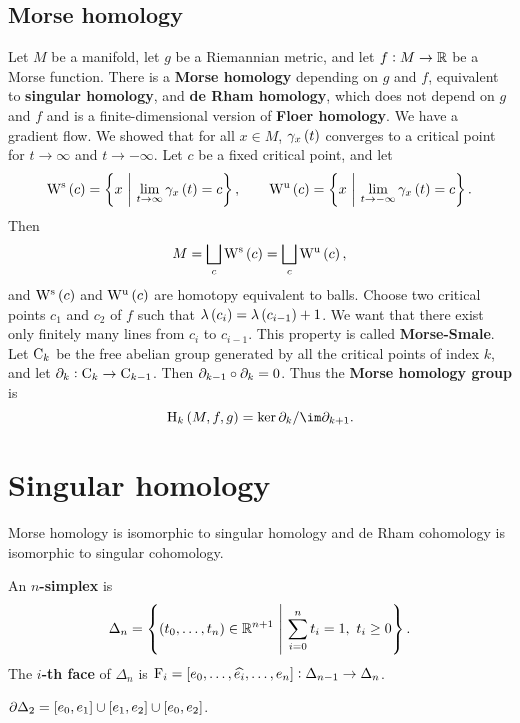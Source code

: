 \subsection{Morse homology}

Let $ M $ be a manifold, let $ g $ be a Riemannian metric, and let $ f : M \to \mathbb{R} $ be a Morse function. There is a \textbf{Morse homology} depending on $ g $ and $ f $, equivalent to \textbf{singular homology}, and \textbf{de Rham homology}, which does not depend on $ g $ and $ f $ and is a finite-dimensional version of \textbf{Floer homology}. We have a gradient flow. We showed that for all $ x \in M $, $ \gamma_x\br{t} $ converges to a critical point for $ t \to \infty $ and $ t \to -\infty $. Let $ c $ be a fixed critical point, and let
$$ \W^\s\br{c} = \cbr{x \st \lim_{t \to \infty} \gamma_x\br{t} = c}, \qquad \W^\u\br{c} = \cbr{x \st \lim_{t \to -\infty} \gamma_x\br{t} = c}. $$
Then
$$ M = \bigsqcup_c \W^\s\br{c} = \bigsqcup_c \W^\u\br{c}, $$
and $ \W^\s\br{c} $ and $ \W^\u\br{c} $ are homotopy equivalent to balls. Choose two critical points $ c_1 $ and $ c_2 $ of $ f $ such that $ \lambda\br{c_i} = \lambda\br{c_{i - 1}} + 1 $. We want that there exist only finitely many lines from $ c_i $ to $ c_{i - 1} $. This property is called \textbf{Morse-Smale}. Let $ \mathrm{C}_k $ be the free abelian group generated by all the critical points of index $ k $, and let $ \partial_k : \mathrm{C}_k \to \mathrm{C}_{k - 1} $. Then $ \partial_{k - 1} \circ \partial_k = 0 $. Thus the \textbf{Morse homology group} is
$$ \H_k\br{M, f, g} = \ker \da_k / \im \da_{k + 1}. $$

\pagebreak

\section{Singular homology}


Morse homology is isomorphic to singular homology and de Rham cohomology is isomorphic to singular cohomology.

\begin{definition}
An \textbf{$ n $-simplex} is
$$ \Delta_n = \cbr{\br{t_0, \dots, t_n} \in \RR^{n + 1} \st \sum_{i = 0}^n t_i = 1, \ t_i \ge 0}. $$
The \textbf{$ i $-th face} of $ \Delta_n $ is $ \F_i = \sbr{e_0, \dots, \widehat{e_i}, \dots, e_n} : \Delta_{n - 1} \to \Delta_n $.
\end{definition}

\begin{example}
$ \da\Delta_2 = \sbr{e_0, e_1} \cup \sbr{e_1, e_2} \cup \sbr{e_0, e_2} $.
\end{example}

